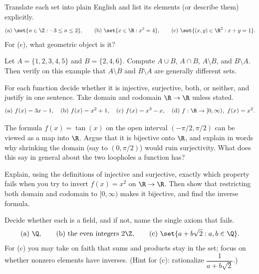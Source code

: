 \begin{exercise}
Translate each set into plain English and list its elements (or describe them) explicitly.
\[
  \text{(a) } \set{n \in \Z : -3 \le n \le 2}, \qquad
  \text{(b) } \set{x \in \R : x^2 = 4}, \qquad
  \text{(c) } \set{(x,y)\in\R^2 : x + y = 1}.
\]
For (c), what geometric object is it?
\end{exercise}

\begin{exercise}
Let $A = \{1,2,3,4,5\}$ and $B = \{2,4,6\}$. Compute $A \cup B$, $A \cap B$, $A \setminus
B$, and $B \setminus A$. Then verify on this example that $A \setminus B$ and $B \setminus
A$ are generally different sets.
\end{exercise}

\begin{exercise}
For each function decide whether it is injective, surjective, both, or neither, and justify
in one sentence. Take domain and codomain $\R \to \R$ unless stated.
\[
  \text{(a) } f(x) = 3x - 1, \quad
  \text{(b) } f(x) = x^2 + 1, \quad
  \text{(c) } f(x) = x^3 - x, \quad
  \text{(d) } f:\R\to[0,\infty),\ f(x)=x^2.
\]
\end{exercise}

\begin{exercise}
The formula $f(x) = \tan(x)$ on the open interval $(-\pi/2, \pi/2)$ can be viewed as a map
into $\R$. Argue that it is bijective onto $\R$, and explain in words why shrinking the
domain (say to $(0,\pi/2)$) would ruin surjectivity. What does this say in general about
the two loopholes a function has?
\end{exercise}

\begin{exercise}
Explain, using the definitions of injective and surjective, exactly which property fails
when you try to invert $f(x) = x^2$ on $\R\to\R$. Then show that restricting both domain
and codomain to $[0,\infty)$ makes it bijective, and find the inverse formula.
\end{exercise}

\begin{exercise}[Is it a field?]
Decide whether each is a field, and if not, name the single axiom that fails.
\[
  \text{(a) } \Q, \qquad
  \text{(b) the even integers } 2\Z, \qquad
  \text{(c) } \set{a + b\sqrt 2 : a,b \in \Q}.
\]
For (c) you may take on faith that sums and products stay in the set; focus on whether
nonzero elements have inverses. (Hint for (c): rationalize $\dfrac{1}{a + b\sqrt 2}$.)
\end{exercise}

